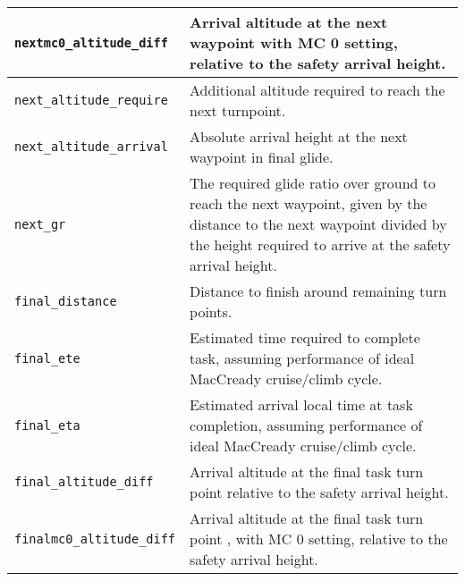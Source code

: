 \begin{maxipage}
\begin{tabularx}{1.9\textwidth}{l|X}
\hline

\verb|nextmc0_altitude_diff| & Arrival altitude at the next waypoint with 
MC 0 setting, relative to the \newline safety arrival height. \\

\hline

\verb|next_altitude_require| & Additional altitude required to reach the next
turnpoint. \\

\hline

\verb|next_altitude_arrival| & Absolute arrival height at the next waypoint in 
final glide. \\

\hline

\verb|next_gr| & The required glide ratio over ground to reach the next waypoint, 
\newline given by the distance to the next waypoint divided by the height 
\newline required to arrive at the safety arrival height. \\

\hline

\verb|final_distance| & Distance to finish around remaining turn points. \\

\hline

\verb|final_ete| & Estimated time required to complete task, 
assuming performance \newline of ideal MacCready cruise/climb cycle. \\

\hline

\verb|final_eta| & Estimated arrival local time at task completion, 
assuming performance \newline of ideal MacCready cruise/climb cycle. \\

\hline

\verb|final_altitude_diff| & Arrival altitude at the final task turn point
relative to the safety arrival \newline height. \\

\hline

\verb|finalmc0_altitude_diff| & Arrival altitude at the final task turn point
, with MC 0 setting, relative \newline to the safety arrival height. \\


\end{tabularx}
\end{maxipage}
